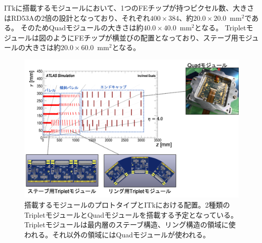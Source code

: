 ITkに搭載するモジュールにおいて、1つのFEチップが持つピクセル数、大きさはRD53Aの2倍の設計となっており、それぞれ$400\times 384$、約$20.0\times 20.0$~mm$^2$である。
そのためQuadモジュールの大きさは約$40.0\times 40.0$~mm$^2$となる。
Tripletモジュールは図のようにFEチップが横並びの配置となっており、ステーブ用モジュールの大きさは約$20.0\times 60.0$~mm$^2$となる。

\begin{figure}[bpt]\centering
\includegraphics[width=12cm]{./module_geom.png}
\caption[搭載するモジュールのプロトタイプとITkにおける配置]{搭載するモジュールのプロトタイプとITkにおける配置。2種類のTripletモジュールとQuadモジュールを搭載する予定となっている。Tripletモジュールは最内層のステーブ構造、リング構造の領域に使われる。それ以外の領域にはQuadモジュールが使われる。}
\label{module_geom}
\end{figure}


